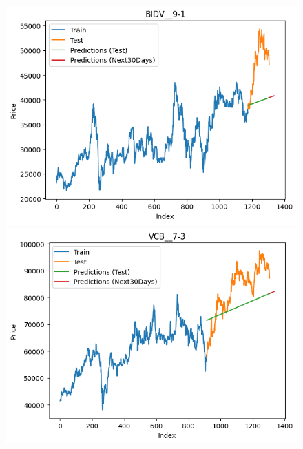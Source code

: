 \begin{figure}[H]
\begin{minipage}{0.15\textwidth}
    \end{minipage}
    \hfill
        \begin{minipage}{0.15\textwidth}
    \centering
    \includegraphics[width=1\textwidth]{resources/chapter-5/newdata/result/BIDV_LinearRegression_9-1.png}
    \end{minipage}
    \hfill
    \begin{minipage}{0.15\textwidth}
    \centering
    \includegraphics[width=1\textwidth]{resources/chapter-5/newdata/result/VCB_LinearRegression_7-3.png}
    \end{minipage}
    \hfill
    \begin{minipage}{0.15\textwidth}
    \centering

\end{minipage}
\end{figure}
